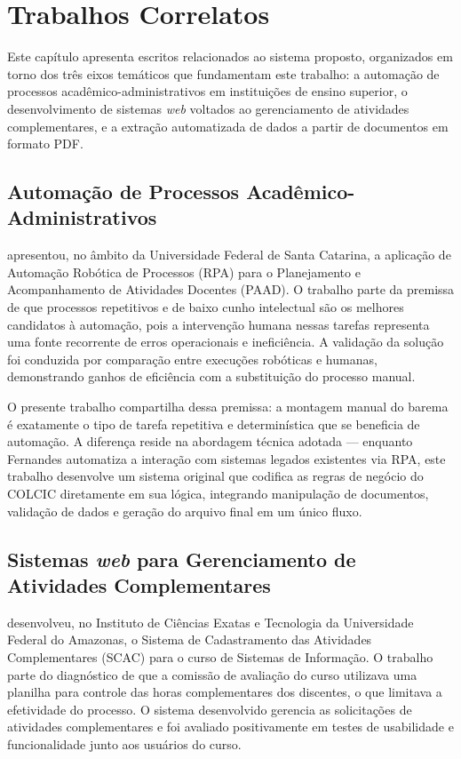 \chapter{Trabalhos Correlatos}
\label{cap:trabalhos-correlatos}

Este capítulo apresenta escritos relacionados ao sistema proposto, 
organizados em torno dos três eixos temáticos que fundamentam este trabalho:
a automação de processos acadêmico-administrativos em 
instituições de ensino superior, o desenvolvimento de sistemas \textit{web} 
voltados ao gerenciamento de atividades complementares, e a extração 
automatizada de dados a partir de documentos em formato PDF.

\section{Automação de Processos Acadêmico-Administrativos}

 apresentou, no âmbito da Universidade Federal de 
Santa Catarina, a aplicação de Automação Robótica de Processos (RPA) 
para o Planejamento e Acompanhamento de Atividades Docentes (PAAD). 
O trabalho parte da premissa de que processos repetitivos e de baixo 
cunho intelectual são os melhores candidatos à automação, pois a 
intervenção humana nessas tarefas representa uma fonte recorrente de 
erros operacionais e ineficiência. A validação da solução foi conduzida 
por comparação entre execuções robóticas e 
humanas, demonstrando ganhos de eficiência com a substituição do 
processo manual.

O presente trabalho compartilha dessa premissa: a montagem manual do 
barema é exatamente o tipo de tarefa repetitiva e determinística que 
se beneficia de automação. A diferença reside na abordagem técnica 
adotada — enquanto Fernandes automatiza a interação com sistemas 
legados existentes via RPA, este trabalho desenvolve um sistema 
original que codifica as regras de negócio do COLCIC diretamente em 
sua lógica, integrando manipulação de documentos, validação de dados 
e geração do arquivo final em um único fluxo.

\section{Sistemas \textit{web} para Gerenciamento de Atividades Complementares}

 desenvolveu, no Instituto de Ciências Exatas e 
Tecnologia da Universidade Federal do Amazonas, o Sistema de 
Cadastramento das Atividades Complementares (SCAC) para o curso de Sistemas 
de Informação. O trabalho parte do diagnóstico de que a comissão de 
avaliação do curso utilizava uma planilha para controle das horas 
complementares dos discentes, o que limitava a efetividade do processo. 
O sistema desenvolvido gerencia as solicitações de atividades 
complementares e foi avaliado positivamente em testes de usabilidade e 
funcionalidade junto aos usuários do curso.

